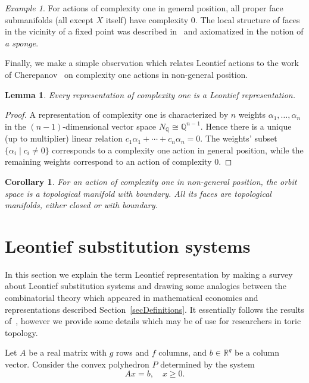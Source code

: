 \documentclass[english,12pt,oneside]{amsproc}
\newcommand{\Ro}{\mathbb{R}}
\newcommand{\Qo}{\mathbb{Q}}
\newcommand{\Nq}{N_\Qo}
\newcounter{stmcounter}[section]
\numberwithin{equation}{section}
\theoremstyle{plain}
\newtheorem{cor}[stmcounter]{Corollary}
\newtheorem{lem}[stmcounter]{Lemma}
\theoremstyle{definition}
\theoremstyle{remark}
\newtheorem{ex}[stmcounter]{Example}
\begin{document}
\begin{ex}
For actions of complexity one in general position, all proper face submanifolds (all except $X$ itself) have complexity $0$. The local structure of faces in the vicinity of a fixed point was described in~\cite{AyzCompl} and axiomatized in the notion of \emph{a sponge}.
\end{ex}

Finally, we make a simple observation which relates Leontief actions to the work of Cherepanov~\cite{Cher} on complexity one actions in non-general position.

\begin{lem}
Every representation of complexity one is a Leontief representation.
\end{lem}

\begin{proof}
A representation of complexity one is characterized by $n$ weights $\alpha_1,\ldots,\alpha_n$ in the $(n-1)$-dimensional vector space $\Nq\cong\Qo^{n-1}$. Hence there is a unique (up to multiplier) linear relation $c_1\alpha_1+\cdots+c_n\alpha_n=0$. The weights' subset $\{\alpha_i\mid c_i\neq0\}$ corresponds to a complexity one action in general position, while the remaining weights correspond to an action of complexity $0$.
\end{proof}

\begin{cor}
For an action of complexity one in non-general position, the orbit space is a topological manifold with boundary. All its faces are topological manifolds, either closed or with boundary.
\end{cor}



\appendix

\section{Leontief substitution systems}\label{secLeontief}

In this section we explain the term Leontief representation by making a survey about Leontief substitution systems and drawing some analogies between the combinatorial theory which appeared in mathematical economics and representations described Section~\ref{secDefinitions}. It essentially follows the results of~\cite{BilProv}, however we provide some details which may be of use for researchers in toric topology.

Let $A$ be a real matrix with $g$ rows and $f$ columns, and $b\in\Ro^g$ be a column vector. Consider the convex polyhedron $P$ determined by the system
\begin{equation}\label{eqPolyhedron}
Ax=b,\quad x\geqslant 0.
\end{equation}
\end{document}
